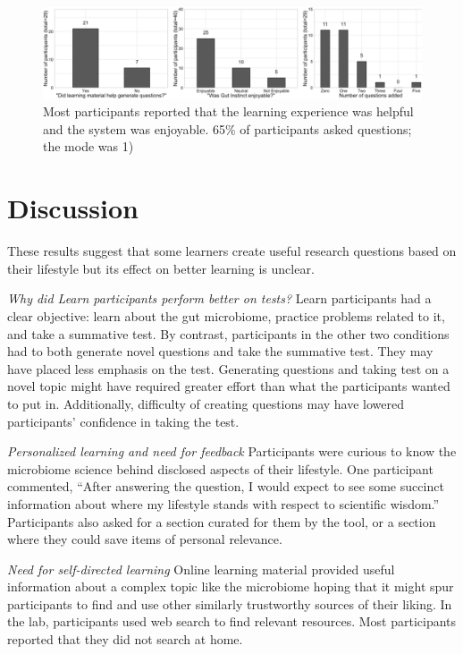 \begin{figure}[h] 
  \centering
  \includegraphics[width=1.0\textwidth]{figures/gutinstinct/gi-9.png}
  \caption[Participants' self-reports]
{Most participants reported that the learning experience was helpful and the system was enjoyable. 65\% of participants asked questions; the mode was 1) }
  \label{fig:gi-9}
\end{figure}

\section{Discussion}
These results suggest that some learners create useful research questions based on their lifestyle but its effect on better learning is unclear.

\textit{Why did Learn participants perform better on tests?}
Learn participants had a clear objective: learn about the gut microbiome, practice problems related to it, and take a summative test. By contrast, participants in the other two conditions had to both generate novel questions and take the summative test. They may have placed less emphasis on the test. Generating questions and taking test on a novel topic might have required greater effort than what the participants wanted to put in. Additionally, difficulty of creating questions may have lowered participants’ confidence in taking the test. 

\textit{Personalized learning and need for feedback}
Participants were curious to know the microbiome science behind disclosed aspects of their lifestyle. One participant commented, “After answering the question, I would expect to see some succinct information about where my lifestyle stands with respect to scientific wisdom.” Participants also asked for a section curated for them by the tool, or a section where they could save items of personal relevance.
 
\textit{Need for self-directed learning}
Online learning material provided useful information about a complex topic like the microbiome hoping that it might spur participants to find and use other similarly trustworthy sources of their liking. In the lab, participants used web search to find relevant resources. Most participants reported that they did not search at home. 

